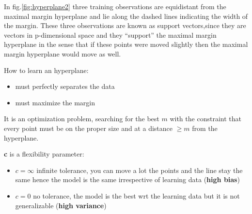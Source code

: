 In fig.\ref{fig:hyperplane2} three training observations are equidistant from the maximal margin hyperplane and lie along the dashed lines indicating the width of the margin. These three observations are known as support vectors,since they are vectors in p-dimensional space and they “support” the maximal margin hyperplane in the sense that if these points were moved slightly then the maximal margin hyperplane would move as well.

How to learn an hyperplane:
\begin{itemize}
    \item must perfectly separates the data
    \item must maximize the margin
\end{itemize}

It is an optimization problem, searching for the best $m$ with the constraint that every point must be on the proper size and at a distance $\geq m$ from the hyperplane.



\textbf{c} is a flexibility parameter:
\begin{itemize}
    \item $c = \infty$ \to infinite tolerance, you can move a lot the points and the line stay the same hence the model is the same irrespective of learning data (\textbf{high bias})
    \item $c = 0$ \to no tolerance, the model is the best wrt the learning data but it is not generalizable (\textbf{high variance})
\end{itemize}

